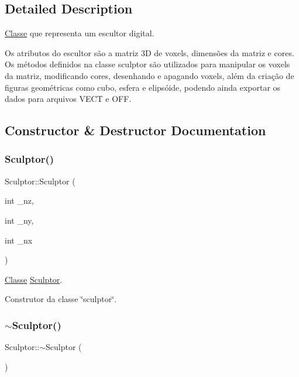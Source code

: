\subsection{Detailed Description}
\mbox{\hyperlink{classClasse}{Classe}} que representa um escultor digital. 

Os atributos do escultor são a matriz 3D de voxels, dimensões da matriz e cores. Os métodos definidos na classe sculptor são utilizados para manipular os voxels da matriz, modificando cores, desenhando e apagando voxels, além da criação de figuras geométricas como cubo, esfera e elipsóide, podendo ainda exportar os dados para arquivos V\+E\+CT e O\+FF. 

\subsection{Constructor \& Destructor Documentation}
\mbox{\label{classSculptor_ab03ab031a9cf17099569fbca9758fa0f}} 
\subsubsection{\texorpdfstring{Sculptor()}{Sculptor()}}
{\footnotesize\ttfamily Sculptor\+::\+Sculptor (\begin{DoxyParamCaption}\item[{int}]{\+\_\+nz,  }\item[{int}]{\+\_\+ny,  }\item[{int}]{\+\_\+nx }\end{DoxyParamCaption})}



\mbox{\hyperlink{classClasse}{Classe}} \mbox{\hyperlink{classSculptor}{Sculptor}}. 

Construtor da classe \char`\"{}sculptor\char`\"{}. \mbox{\label{classSculptor_a8f159bf97458326f16d2e238e11be7ff}} 
\subsubsection{\texorpdfstring{$\sim$Sculptor()}{~Sculptor()}}
{\footnotesize\ttfamily Sculptor\+::$\sim$\+Sculptor (\begin{DoxyParamCaption}{ }\end{DoxyParamCaption})}

